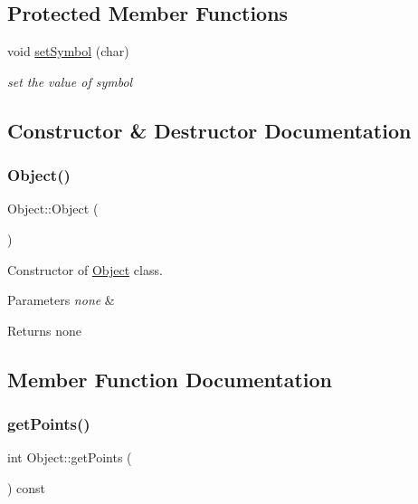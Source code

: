 \subsection*{Protected Member Functions}
\begin{DoxyCompactItemize}
\item 
void \hyperlink{class_object_a7f524c95bbc774e71d692125d085be7e}{set\+Symbol} (char)
\begin{DoxyCompactList}\small\item\em set the value of symbol \end{DoxyCompactList}\end{DoxyCompactItemize}


\subsection{Constructor \& Destructor Documentation}
\mbox{\label{class_object_a40860402e64d8008fb42329df7097cdb}} 
\subsubsection{\texorpdfstring{Object()}{Object()}}
{\footnotesize\ttfamily Object\+::\+Object (\begin{DoxyParamCaption}{ }\end{DoxyParamCaption})}



Constructor of \hyperlink{class_object}{Object} class. 


\begin{DoxyParams}{Parameters}
{\em none} & \\
\hline
\end{DoxyParams}
\begin{DoxyReturn}{Returns}
none 
\end{DoxyReturn}


\subsection{Member Function Documentation}
\mbox{\label{class_object_a555148cd05b5b98d4d18b4cc5dc06a37}} 
\subsubsection{\texorpdfstring{get\+Points()}{getPoints()}}
{\footnotesize\ttfamily int Object\+::get\+Points (\begin{DoxyParamCaption}{ }\end{DoxyParamCaption}) const}



